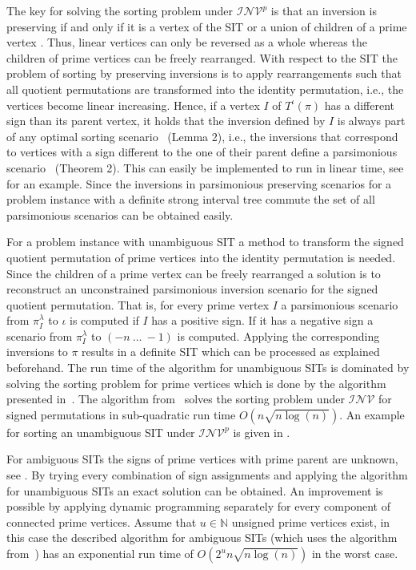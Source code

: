 \documentclass{svmult}
\newcommand{\m}[1]{\mathcal{#1}}
\begin{document}
The key for solving the sorting problem under $\m{INV}^p$ is that 
an inversion is preserving if and only if it is a vertex of the SIT or a union 
of children of a prime vertex \cite{Berard_2007}. Thus, linear vertices can 
only be reversed as a whole whereas the children of prime vertices can be freely rearranged. With respect to the SIT the problem of sorting by preserving inversions 
is to apply rearrangements such that all quotient permutations are transformed 
into the identity permutation, i.e., the vertices become linear increasing. 
Hence, if a vertex $I$ of ${T}^\iota(\pi)$ has a different sign than its
parent vertex, it holds that the inversion defined by $I$ is always part of any
optimal sorting scenario~\cite{Berard_2007} (Lemma 2), i.e., 
the inversions that correspond to vertices with a sign different to the one of their parent define a parsimonious scenario~\cite{Berard_2007} (Theorem 2).
This can easily be implemented to run in linear time, see  for an example. 
Since the inversions in parsimonious preserving scenarios for a problem instance with a definite strong interval tree commute the set of all parsimonious scenarios can be obtained easily.

For a problem instance with unambiguous SIT a method to transform the signed quotient
permutation of prime vertices into the identity permutation is needed. 
Since the children of a prime vertex can be freely rearranged a solution is 
to reconstruct an unconstrained parsimonious inversion scenario for the signed quotient 
permutation. That is, for every prime vertex $I$ a parsimonious scenario from $\pi^\lambda_I$ to $\iota$ is computed 
if $I$ has a positive sign. If it has a
negative sign a scenario from $\pi^\lambda_{I}$ to $(-{n}~\ldots~-{1})$ is
computed.
Applying the corresponding inversions to $\pi$ results in a definite SIT which can be processed as explained beforehand.
%
The run time of the algorithm for unambiguous SITs is dominated by solving the sorting problem for prime vertices
which is done by the algorithm presented in~\cite{Tannier_2007}.
The algorithm from~\cite{Tannier_2007} solves the sorting problem under
$\m{INV}$ for signed permutations in  sub-quadratic run time
$O(n\sqrt{n\log{(n)}})$. An example for sorting an
unambiguous SIT under $\m{INV}^p$ is given in .

For ambiguous SITs the signs of prime vertices with prime parent are unknown,
see . 
By trying every combination of sign assignments and applying the algorithm for unambiguous SITs an exact solution can be obtained. 
An improvement is possible by applying dynamic programming separately for every component of connected 
prime vertices. 
Assume that $u\in\mathbb{N}$ unsigned prime vertices exist, in this
case the described algorithm for ambiguous SITs (which uses the algorithm
from~\cite{Tannier_2007}) has an exponential run time of
$O(2^{u}n\sqrt{n\log{(n)}})$ in the worst case.
\end{document}
